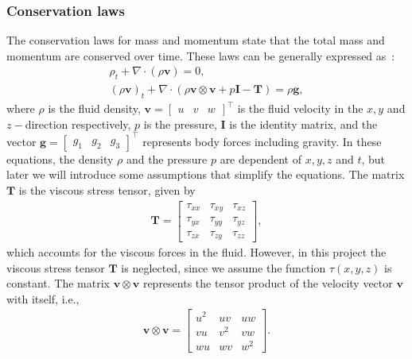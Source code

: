 \subsubsection*{Conservation laws}
The conservation laws for mass and momentum state that the total mass and momentum are conserved over time.
These laws can be generally expressed as~\cite[eq.'s (2.1) and (2.2)]{Toro2001-Shock}:
\begin{subequations}
    \begin{align}
        \rho_t + \nabla \cdot (\rho \mathbf{v}) = 0, \label{eq:mass_conservation} \\
        {(\rho \mathbf{v})}_t + \nabla \cdot (\rho \mathbf{v} \otimes \mathbf{v} + p \mathbf{I} - \mathbf{T}) = \rho \mathbf{g}, \label{eq:momentum_conservation}
    \end{align}
  \end{subequations}
where $\rho$ is the fluid density, $\mathbf{v} = \begin{bmatrix} u & v & w \end{bmatrix}^\top$ is the fluid velocity in the $x, y$ and $z-$direction respectively,
$p$ is the pressure, $\mathbf{I}$ is the identity matrix, and the vector $\mathbf{g} = \begin{bmatrix}
    g_1 & g_2 & g_3
\end{bmatrix}^\top$ represents body forces including gravity.
In these equations, the density $\rho$ and the pressure $p$ are dependent of $x, y, z$ and $t$, but later we will introduce some assumptions that simplify the equations.
The matrix $\mathbf{T}$ is the viscous stress tensor, given by
\begin{align*}
    \mathbf{T} = \begin{bmatrix}
        \tau_{xx} & \tau_{xy} & \tau_{xz} \\
        \tau_{yx} & \tau_{yy} & \tau_{yz} \\
        \tau_{zx} & \tau_{zy} & \tau_{zz}
    \end{bmatrix},
\end{align*}
which accounts for the viscous forces in the fluid.
However, in this project the viscous stress tensor $\mathbf{T}$ is neglected, since we assume the function $\tau(x,y,z)$ is constant.
The matrix $\mathbf{v} \otimes \mathbf{v}$ represents the tensor product of the velocity vector $\mathbf{v}$ with itself, i.e.,
\begin{align*}
    \mathbf{v} \otimes \mathbf{v} = \begin{bmatrix}
        u^2 & uv & uw \\
        vu & v^2 & vw \\
        wu & wv & w^2
    \end{bmatrix}.
\end{align*}
